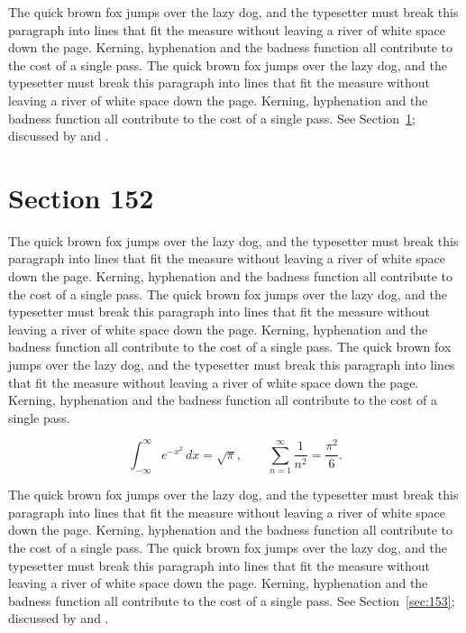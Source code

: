 \documentclass{article}
\begin{document}
The quick brown fox jumps over the lazy dog, and the typesetter must break this paragraph into lines that fit the measure without leaving a river of white space down the page. Kerning, hyphenation and the badness function all contribute to the cost of a single pass. The quick brown fox jumps over the lazy dog, and the typesetter must break this paragraph into lines that fit the measure without leaving a river of white space down the page. Kerning, hyphenation and the badness function all contribute to the cost of a single pass. 
See Section~\ref{sec:152}; discussed by \textcite{k2} and \textcite{l4}.
\section{Section 152}
\label{sec:152}
The quick brown fox jumps over the lazy dog, and the typesetter must break this paragraph into lines that fit the measure without leaving a river of white space down the page. Kerning, hyphenation and the badness function all contribute to the cost of a single pass. The quick brown fox jumps over the lazy dog, and the typesetter must break this paragraph into lines that fit the measure without leaving a river of white space down the page. Kerning, hyphenation and the badness function all contribute to the cost of a single pass. The quick brown fox jumps over the lazy dog, and the typesetter must break this paragraph into lines that fit the measure without leaving a river of white space down the page. Kerning, hyphenation and the badness function all contribute to the cost of a single pass. 

\begin{equation}\label{eq:152}
\int_{-\infty}^{\infty} e^{-x^{2}}\,dx = \sqrt{\pi}, \qquad
\sum_{n=1}^{\infty} \frac{1}{n^{2}} = \frac{\pi^{2}}{6}.
\end{equation}

The quick brown fox jumps over the lazy dog, and the typesetter must break this paragraph into lines that fit the measure without leaving a river of white space down the page. Kerning, hyphenation and the badness function all contribute to the cost of a single pass. The quick brown fox jumps over the lazy dog, and the typesetter must break this paragraph into lines that fit the measure without leaving a river of white space down the page. Kerning, hyphenation and the badness function all contribute to the cost of a single pass. 
See Section~\ref{sec:153}; discussed by \textcite{k3} and \textcite{l5}.
\end{document}
